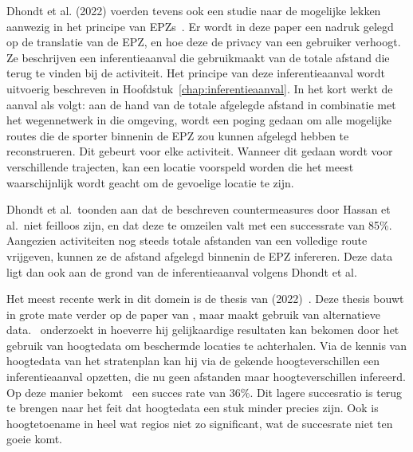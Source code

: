 Dhondt et al. (2022) voerden tevens ook een studie naar de mogelijke lekken
aanwezig in het principe van \acp{EPZ}~\cite{Dhondt}. Er wordt in deze paper
een nadruk gelegd op de translatie van de \ac{EPZ}, en hoe deze de privacy van
een gebruiker verhoogt. Ze beschrijven een inferentieaanval die gebruikmaakt
van de totale afstand die terug te vinden bij de activiteit. Het principe van
deze inferentieaanval wordt uitvoerig beschreven in
Hoofdstuk~\ref{chap:inferentieaanval}. In het kort werkt de aanval als volgt:
aan de hand van de totale afgelegde afstand in combinatie met het wegennetwerk
in die omgeving, wordt een poging gedaan om alle mogelijke routes die de
sporter binnenin de \ac{EPZ} zou kunnen afgelegd hebben te reconstrueren. Dit
gebeurt voor elke activiteit. Wanneer dit gedaan wordt voor verschillende
trajecten, kan een locatie voorspeld worden die het meest waarschijnlijk wordt
geacht om de gevoelige locatie te zijn.

Dhondt et al.\ toonden aan dat de beschreven countermeasures door Hassan et
al.\ niet feilloos zijn, en dat deze te omzeilen valt met een successrate van
85\%. Aangezien activiteiten nog steeds totale afstanden van een volledige
route vrijgeven, kunnen ze de afstand afgelegd binnenin de EPZ infereren. Deze
data ligt dan ook aan de grond van de inferentieaanval volgens Dhondt et al.

Het meest recente werk in dit domein is de thesis van
\citeauthor{Verdonck_2022} (2022)~\cite{Verdonck_2022}. Deze thesis bouwt in
grote mate verder op de paper van \citeauthor{Dhondt}, maar maakt gebruik van
alternatieve data.\ \citeauthor{Verdonck_2022} onderzoekt in hoeverre hij
gelijkaardige resultaten kan bekomen door het gebruik van hoogtedata om
beschermde locaties te achterhalen. Via de kennis van hoogtedata van het
stratenplan kan hij via de gekende hoogteverschillen een inferentieaanval
opzetten, die nu geen afstanden maar hoogteverschillen infereerd. Op deze
manier bekomt~\citeauthor{Verdonck_2022} een succes rate van 36\%. Dit lagere
succesratio is terug te brengen naar het feit dat hoogtedata een stuk minder
precies zijn. Ook is hoogtetoename in heel wat regios niet zo significant, wat
de succesrate niet ten goeie komt.

